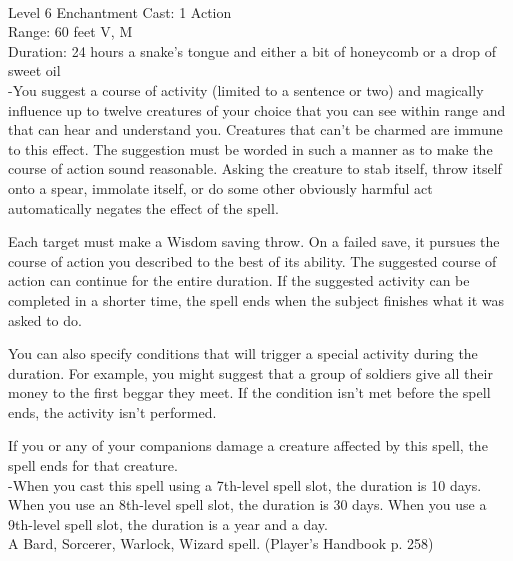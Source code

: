 \documentclass[10pt,twocolumn]{report}
\begin{document}
 \\
Level 6 \quad Enchantment \quad Cast: 1 Action\\
Range: 60 feet \quad V, M\\
Duration: 24 hours \quad a snake’s tongue and either a bit of honeycomb or a drop of sweet oil\\
-You suggest a course of activity (limited to a sentence or two) and magically influence up to twelve creatures of your choice that you can see within range and that can hear and understand you.
Creatures that can’t be charmed are immune to this effect. The suggestion must be worded in such a manner as to make the course of action sound reasonable. Asking the creature to stab itself, throw itself onto a spear, immolate itself, or do some other obviously harmful act automatically negates the effect of the spell.

Each target must make a Wisdom saving throw. On a failed save, it pursues the course of action you described to the best of its ability. The suggested course of action can continue for the entire duration. If the suggested activity can be completed in a shorter time, the spell ends when the subject finishes what it was asked to do.

You can also specify conditions that will trigger a special activity during the duration. For example, you might suggest that a group of soldiers give all their money to the first beggar they meet. If the condition isn’t met before the spell ends, the activity isn’t performed.

If you or any of your companions damage a creature affected by this spell, the spell ends for that creature.\\
-When you cast this spell using a 7th-level spell slot, the duration is 10 days.
When you use an 8th-level spell slot, the duration is 30 days.
When you use a 9th-level spell slot, the duration is a year and a day.\\
A Bard, Sorcerer, Warlock, Wizard spell. (Player's Handbook p. 258) \\
\end{document}

